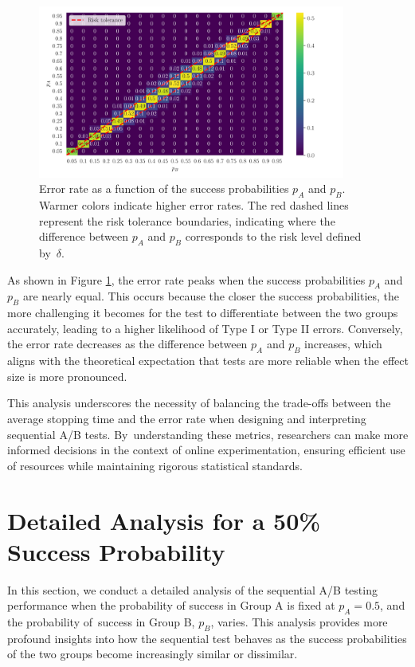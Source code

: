 \documentclass[magisterska, english]{pwr_wmat_praca_dyplomowa}
\theoremstyle{plain}
\numberwithin{theorem}{chapter}
\theoremstyle{definition}
\numberwithin{theorem}{chapter}
\begin{document}
\begin{figure}[H]
	\centering
	\includegraphics[width=0.9\textwidth]{images/error_rate_matrix.png}
	\caption{Error rate as a function of the success probabilities \( p_A \) and \( p_B \). Warmer colors indicate higher error rates. The red dashed lines represent the risk tolerance boundaries, indicating where the difference between \( p_A \) and \( p_B \) corresponds to the risk level defined by~\( \delta \).}
	\label{fig:error_rate}
\end{figure}

As shown in Figure \ref{fig:error_rate}, the error rate peaks when the success probabilities \( p_A \) and \( p_B \) are nearly equal. This occurs because the closer the success probabilities, the more challenging it becomes for the test to differentiate between the two groups accurately, leading to a higher likelihood of Type I or Type II errors. Conversely, the error rate decreases as the difference between \( p_A \) and \( p_B \) increases, which aligns with the theoretical expectation that tests are more reliable when the effect size is more pronounced.

This analysis underscores the necessity of balancing the trade-offs between the average stopping time and the error rate when designing and interpreting sequential A/B tests. By~understanding these metrics, researchers can make more informed decisions in the context of online experimentation, ensuring efficient use of resources while maintaining rigorous statistical standards.

\section{Detailed Analysis for a 50\% Success Probability}

In this section, we conduct a detailed analysis of the sequential A/B testing performance when the probability of success in Group A is fixed at \( p_A = 0.5 \), and the probability of~success in Group B, \( p_B \), varies. This analysis provides more profound insights into how the sequential test behaves as the success probabilities of the two groups become increasingly similar or dissimilar.
\end{document}
